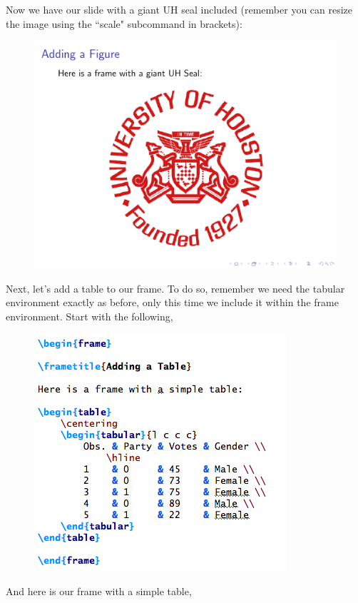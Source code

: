 \documentclass[11pt]{article}
\begin{document}
Now we have our slide with a giant UH seal included (remember you can resize the image using the ``scale" subcommand in brackets):

\begin{figure}[!h]
	\includegraphics[scale=.5]{OUT9}
	\centering
\end{figure}

Next, let's add a table to our frame. To do so, remember we need the tabular environment exactly as before, only this time we include it within the frame environment. Start with the following,

\begin{figure}[!h]
	\includegraphics[scale=.6]{CODE10}
	\centering
\end{figure}

And here is our frame with a simple table,
\end{document}

